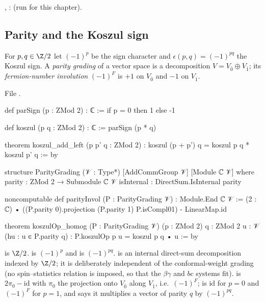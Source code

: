 \begin{status}
\allowbreak{}\allowbreak{}, \allowbreak{}\allowbreak{}\allowbreak{}:
 (run for this chapter).
\end{status}

\subsection{Parity and the Koszul sign}

\begin{definition}\label{l02:def:parity}
For $p,q\in\Z/2$ let $(-1)^p$ be the sign character and $\epsilon(p,q) = (-1)^{pq}$ the Koszul sign. A
\emph{parity grading} of a vector space is a decomposition $V = V_{\bar0}\oplus V_{\bar1}$; its
\emph{fermion-number involution} $(-1)^F$ is $+1$ on $V_{\bar0}$ and $-1$ on $V_{\bar1}$.
\end{definition}

File .
\begin{leancode}
def parSign (p : ZMod 2) : ℂ := if p = 0 then 1 else -1

def koszul (p q : ZMod 2) : ℂ := parSign (p * q)

theorem koszul_add_left (p p' q : ZMod 2) :
    koszul (p + p') q = koszul p q * koszul p' q := by

structure ParityGrading (𝒱 : Type*) [AddCommGroup 𝒱] [Module ℂ 𝒱] where
  parity : ZMod 2 → Submodule ℂ 𝒱
  isInternal : DirectSum.IsInternal parity

noncomputable def parityInvol (P : ParityGrading 𝒱) : Module.End ℂ 𝒱 :=
  (2 : ℂ) • ((P.parity 0).projection (P.parity 1) P.isCompl01) - LinearMap.id

theorem koszulOp_homog (P : ParityGrading 𝒱) (p : ZMod 2) {q : ZMod 2} {u : 𝒱}
    (hu : u ∈ P.parity q) : P.koszulOp p u = koszul p q • u := by
\end{leancode}

\begin{dictionary}
 is $\Z/2$.  is $(-1)^p$ and  is $(-1)^{pq}$.
 is an internal direct-sum decomposition indexed by $\Z/2$; it is deliberately
independent of the conformal-weight grading (no spin--statistics relation is imposed, so that the
$\beta\gamma$ and $bc$ systems fit).  is $2\pi_0 - \mathrm{id}$ with $\pi_0$ the projection onto
$V_{\bar0}$ along $V_{\bar1}$, i.e.\ $(-1)^F$;  is $\mathrm{id}$ for $p = 0$ and $(-1)^F$ for
$p=1$, and  says it multiplies a vector of parity $q$ by $(-1)^{pq}$.
\end{dictionary}

